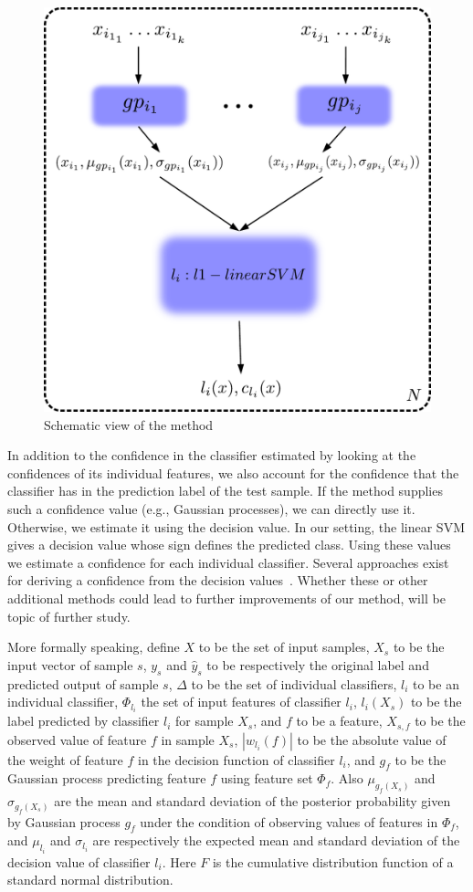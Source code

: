 \begin{figure}[!ht]
  \centering
  \includegraphics[width=.6\textwidth]{figs/rat/m9}
  \caption{Schematic view of the method}
  \label{fig:ratboost-schema}
\end{figure}

In addition to the confidence in the classifier estimated by looking at the confidences of its individual features, we also account for the confidence that the classifier has in the prediction label of the test sample. If the method supplies such a confidence value (e.g., Gaussian processes), we can directly use it. Otherwise, we estimate it using the decision value. In our setting, the linear SVM gives a decision value whose sign defines the predicted class. Using these values we estimate a confidence for each individual classifier. Several approaches exist for deriving a confidence from the decision values~\cite{Lin2007}. Whether these or other additional methods could lead to further improvements of our method, will be topic of further study.

More formally speaking, define $X$ to be the set of input samples, $X_s$ to be the input vector of sample $s$, $y_s$ and $\hat{y}_s$ to be respectively the original label and predicted output of sample $s$, $\Delta$ to be the set of individual classifiers, $l_i$ to be an individual classifier, $\Phi_{l_i}$ the set of input features of classifier $l_i$, $l_i(X_s)$ to be the label predicted by classifier $l_i$ for sample $X_s$, and $f$ to be a feature, $X_{s,f}$ to be the observed value of feature $f$ in sample $X_s$, $|w_{l_i}(f)|$ to be the absolute value of the weight of feature $f$ in the decision function of classifier $l_i$, and $g_f$ to be the Gaussian process predicting feature $f$ using feature set $\Phi_f$.
Also $\mu_{g_f(X_s)}$ and $\sigma_{g_f(X_s)}$ are the mean and standard deviation of the posterior probability given by Gaussian process $g_f$ under the condition of observing values of features in $\Phi_f$, 
and $\mu_{l_i}$ and $\sigma_{l_i}$ are respectively the expected mean and standard deviation of the decision value of classifier $l_i$. Here $F$ is the cumulative distribution function of a standard normal distribution.

